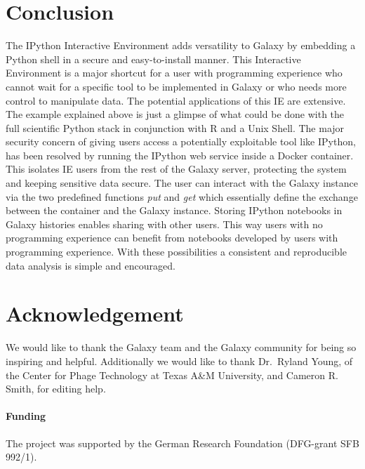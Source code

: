 \documentclass{bioinfo}
\begin{document}
\section{Conclusion}
The IPython Interactive Environment adds versatility to Galaxy by embedding a Python shell in a secure and easy-to-install manner.
This Interactive Environment is a major shortcut for a user with programming experience who cannot wait for a specific tool to
be implemented in Galaxy or who needs more control to manipulate data. The potential applications of this IE are extensive.
The example explained above is just a glimpse of what could be done with the full scientific Python stack in conjunction with R and a Unix Shell.
The major security concern of giving users access a potentially exploitable tool like IPython, 
has been resolved by running the IPython web service inside a Docker container. This 
isolates IE users from the rest of the Galaxy server, protecting the system and keeping sensitive data secure.
The user can interact with the Galaxy instance via the two predefined functions \textit{put} and \textit{get} 
which essentially define the exchange between the container and the Galaxy instance.
Storing IPython notebooks in Galaxy histories enables sharing with other users. 
This way users with no programming experience can benefit from notebooks developed by users with programming experience.
With these possibilities a consistent and reproducible data analysis is simple and encouraged. 


\section*{Acknowledgement}
We would like to thank the Galaxy team and the Galaxy community for being so inspiring and helpful. 
Additionally we would like to thank Dr.~Ryland Young, of the Center for Phage Technology at Texas A\&M University, 
and Cameron R. Smith, for editing help.

\paragraph{Funding\textcolon} The project was supported by the German Research Foundation (DFG-grant SFB 992/1).


%
%
%
%
%
%
%
%
\end{document}
